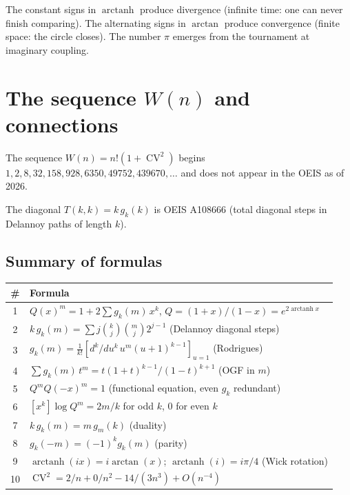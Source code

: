\documentclass[11pt]{amsart}
\theoremstyle{definition}
\DeclareMathOperator{\CV}{CV}
\DeclareMathOperator{\arctanh}{arctanh}
\DeclareMathOperator{\arctan}{arctan}
\begin{document}
The constant signs in $\arctanh$ produce divergence (infinite time: one can never finish comparing). The alternating signs in $\arctan$ produce convergence (finite space: the circle closes). The number $\pi$ emerges from the tournament at imaginary coupling.

\section{The sequence $W(n)$ and connections}

The sequence $W(n) = n!(1 + \CV^2)$ begins $1, 2, 8, 32, 158, 928, 6350, 49752, 439670, \ldots$ and does not appear in the OEIS as of 2026.

The diagonal $T(k,k) = k\,g_k(k)$ is OEIS A108666 (total diagonal steps in Delannoy paths of length $k$).

\subsection{Summary of formulas}

\begin{center}
\renewcommand{\arraystretch}{1.4}
\begin{tabular}{@{}cl@{}}
\toprule
\# & Formula \\
\midrule
1 & $Q(x)^m = 1 + 2\sum g_k(m)\,x^k$, \quad $Q = (1{+}x)/(1{-}x) = e^{2\arctanh x}$ \\
2 & $k\,g_k(m) = \sum j\binom{k}{j}\binom{m}{j}2^{j-1}$ \quad (Delannoy diagonal steps) \\
3 & $g_k(m) = \frac{1}{k!}[d^k/du^k\,u^m(u{+}1)^{k-1}]_{u=1}$ \quad (Rodrigues) \\
4 & $\sum g_k(m)\,t^m = t(1{+}t)^{k-1}/(1{-}t)^{k+1}$ \quad (OGF in $m$) \\
5 & $Q^m Q(-x)^m = 1$ \quad (functional equation, even $g_k$ redundant) \\
6 & $[x^k]\log Q^m = 2m/k$ for odd $k$, $0$ for even $k$ \\
7 & $k\,g_k(m) = m\,g_m(k)$ \quad (duality) \\
8 & $g_k(-m) = (-1)^k g_k(m)$ \quad (parity) \\
9 & $\arctanh(ix) = i\arctan(x)$; \quad $\arctanh(i) = i\pi/4$ \quad (Wick rotation) \\
10 & $\CV^2 = 2/n + 0/n^2 - 14/(3n^3) + O(n^{-4})$ \\
\bottomrule
\end{tabular}
\end{center}
\end{document}
